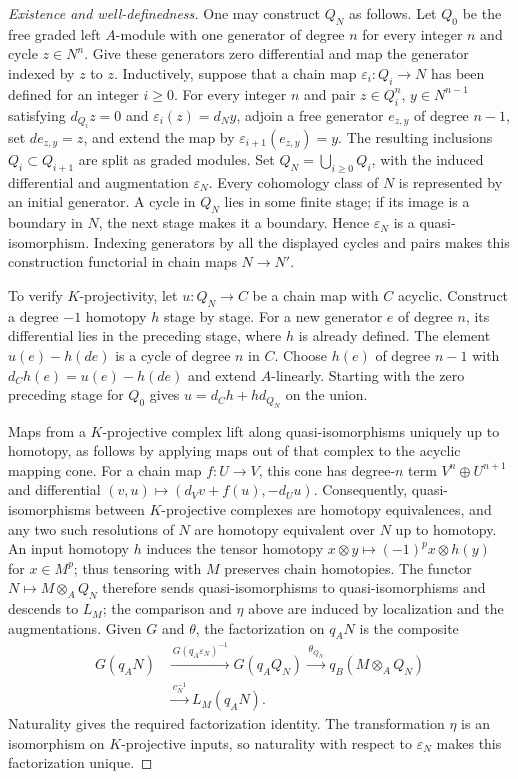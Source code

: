 \documentclass[11pt]{article}
\numberwithin{equation}{section}
\theoremstyle{definition}
\theoremstyle{remark}
\begin{document}
\begin{proof}[Existence and well-definedness]
One may construct $Q_N$ as follows.  Let $Q_0$ be the free graded
left $A$-module with one generator of degree $n$ for every integer
$n$ and cycle $z\in N^n$.  Give these generators zero differential
and map the generator indexed by $z$ to $z$.  Inductively, suppose
that a chain map $\varepsilon_i:Q_i\to N$ has been defined for
an integer $i\geq0$.  For every integer $n$ and pair
$z\in Q_i^n$, $y\in N^{n-1}$ satisfying
$d_{Q_i}z=0$ and $\varepsilon_i(z)=d_Ny$, adjoin a free generator
$e_{z,y}$ of degree $n-1$, set $de_{z,y}=z$, and extend the map
by $\varepsilon_{i+1}(e_{z,y})=y$.  The resulting inclusions
$Q_i\subset Q_{i+1}$ are split as graded modules.  Set
$Q_N=\bigcup_{i\geq0}Q_i$, with the induced differential and
augmentation $\varepsilon_N$.  Every cohomology class of $N$
is represented by an initial generator.  A cycle in $Q_N$ lies in
some finite stage; if its image is a boundary in $N$, the next
stage makes it a boundary.  Hence $\varepsilon_N$ is a
quasi-isomorphism.  Indexing generators by all the displayed cycles
and pairs makes this construction functorial in chain maps $N\to N'$.

To verify $K$-projectivity, let $u:Q_N\to C$ be a chain map with
$C$ acyclic.  Construct a degree $-1$ homotopy $h$ stage by stage.
For a new generator $e$ of degree $n$, its differential lies in
the preceding stage, where $h$ is already defined.  The element
$u(e)-h(de)$ is a cycle of degree $n$ in $C$.  Choose $h(e)$
of degree $n-1$ with $d_Ch(e)=u(e)-h(de)$ and extend
$A$-linearly.  Starting with the zero preceding stage for $Q_0$
gives $u=d_Ch+hd_{Q_N}$ on the union.

Maps from a $K$-projective complex lift along quasi-isomorphisms
uniquely up to homotopy, as follows by applying maps out of that
complex to the acyclic mapping cone.  For a chain map $f:U\to V$,
this cone has degree-$n$ term $V^n\oplus U^{n+1}$ and differential
$(v,u)\mapsto(d_Vv+f(u),-d_Uu)$.  Consequently,
quasi-isomorphisms between $K$-projective complexes are homotopy
equivalences, and any two such resolutions of $N$ are homotopy
equivalent over $N$ up to homotopy.  An input homotopy $h$ induces the tensor homotopy
$x\otimes y\mapsto(-1)^p x\otimes h(y)$ for $x\in M^p$;
thus tensoring with $M$ preserves chain homotopies.  The functor $N\mapsto M\otimes_A Q_N$
therefore sends quasi-isomorphisms to quasi-isomorphisms and
descends to $L_M$; the comparison and $\eta$ above are induced by
localization and the augmentations.  Given $G$ and $\theta$, the
factorization on $q_A N$ is the composite
\[
 \begin{aligned}
 G(q_A N)&\xrightarrow{\,G(q_A\varepsilon_N)^{-1}\,}
 G(q_A Q_N)\xrightarrow{\,\theta_{Q_N}\,}q_B(M\otimes_A Q_N)\\
 &\xrightarrow{\,c_N^{-1}\,}L_M(q_A N).
 \end{aligned}
\]
Naturality gives the required factorization identity.  The transformation $\eta$
is an isomorphism on $K$-projective inputs, so naturality with
respect to $\varepsilon_N$ makes this factorization unique.
\end{proof}
\end{document}

